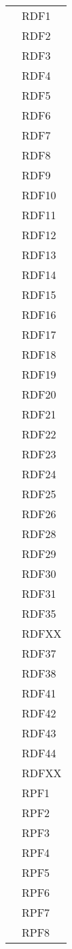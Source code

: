 \begin{longtable}{| p{5cm} | p{5cm} |}
				&	RDF1 \\
				&	RDF2 \\
				&	RDF3 \\
				&	RDF4 \\
				&	RDF5 \\
				&	RDF6 \\
				&	RDF7 \\
				&	RDF8 \\
				&	RDF9 \\
				&	RDF10 \\
				&	RDF11 \\
				&	RDF12 \\
				&	RDF13 \\
				&	RDF14 \\
				&	RDF15 \\
				&	RDF16 \\
				&	RDF17 \\
				&	RDF18 \\
				&	RDF19 \\
				&	RDF20 \\
				&	RDF21 \\
				&	RDF22 \\
				&	RDF23 \\
				&	RDF24 \\
				&	RDF25 \\
				&	RDF26 \\
				&	RDF28 \\
				&	RDF29 \\
				&	RDF30 \\
				&	RDF31 \\
				&	RDF35 \\
				& RDFXX \\%
				&	RDF37 \\
				&	RDF38 \\
				&	RDF41 \\
				&	RDF42 \\
				&	RDF43 \\
				&	RDF44 \\
				& RDFXX \\%
				&	RPF1 \\
				&	RPF2 \\
				&	RPF3 \\
				&	RPF4 \\
				&	RPF5 \\
				&	RPF6 \\
				&	RPF7 \\
				&	RPF8 \\

\end{longtable}

